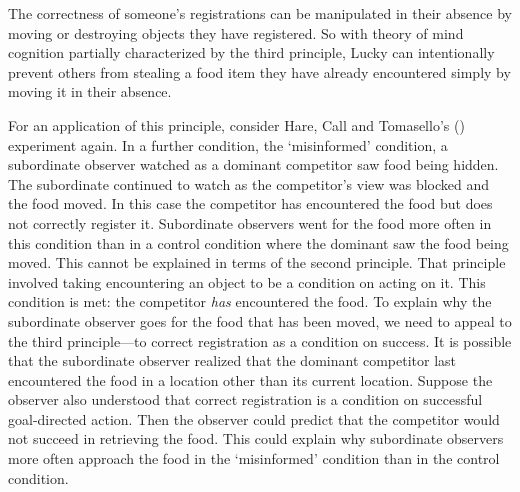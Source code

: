 \documentclass[12pt,\papersize]{extarticle}
\begin{document}
The correctness of someone’s registrations can be manipulated in their absence by moving or destroying objects they have registered.  So with theory of mind cognition partially characterized by the third principle, Lucky can intentionally prevent others from stealing a food item they have already encountered simply by moving it in their absence.

For an application of this principle, consider Hare, Call and Tomasello’s (\citeyear[]{en_1545}) experiment again.  In a further condition, the `misinformed' condition, a subordinate observer watched as a dominant competitor saw food being hidden.  The subordinate continued to watch as the competitor’s view was blocked and the food moved.  In this case the competitor has encountered the food but does not correctly register it.  
Subordinate observers went for the food more often in this condition than in a control condition where the dominant saw the food being moved.  
This cannot be explained in terms of the second principle.  That principle involved taking encountering an object to be a condition on acting on it.  This condition is met: the competitor \textit{has} encountered the food.  To explain why the subordinate observer goes for the food that has been moved, we need to appeal to the third principle—to correct registration as a condition on success.  It is possible that the subordinate observer realized that the dominant competitor last encountered the food in a location other than its current location.  Suppose the observer also understood that correct registration is a condition on successful goal-directed action.  Then the observer could predict that the competitor would not succeed in retrieving the food.  This could explain why  subordinate observers  more often approach the food in the `misinformed' condition than in the control condition.  
\end{document}
